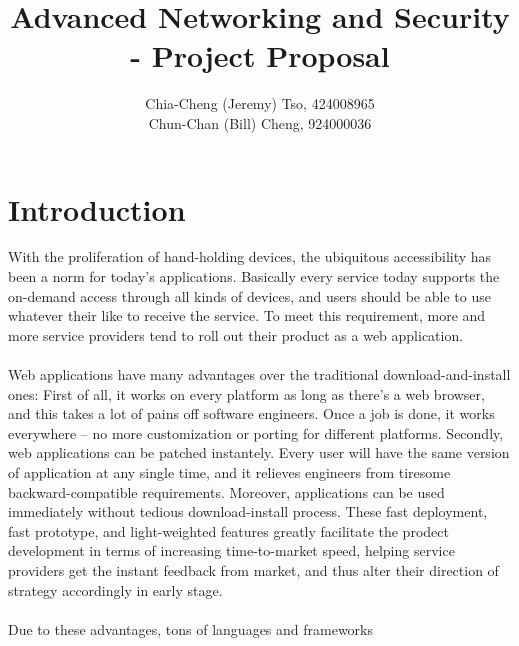 \documentclass[12pt, a4paper]{article}
\title{
    Advanced Networking and Security\\
    - Project Proposal
    \vspace{-2ex}
}
\author{
    \normalfont \normalsize 
    Chia-Cheng (Jeremy) Tso, 
    424008965\\
    \normalfont \normalsize 
    Chun-Chan (Bill) Cheng, 
    924000036
}
\date{
    \normalfont \normalsize 
    \vspace{-5ex}
}
\begin{document}
\maketitle
%

\section{Introduction}
With the proliferation of hand-holding devices,
the ubiquitous accessibility has been a norm for today's applications.
Basically every service today supports the on-demand access through all kinds of devices,
and users should be able to use whatever their like to receive the service.
To meet this requirement, more and more service providers tend to roll
out their product as a
web application.
\\\\
Web applications have many advantages over the traditional download-and-install ones:
First of all, it works on every platform as long as there's a web browser, and
this takes a lot of pains off software engineers. Once a job is done, it works everywhere
-- no more customization or porting for different platforms.
Secondly, web applications can be patched instantely.
Every user will have the same version of application at any single time,
and it relieves engineers from
tiresome backward-compatible requirements.
Moreover,
applications can be used immediately without tedious download-install process.
These fast deployment, fast prototype, and light-weighted features
greatly facilitate the prodect development in terms of
increasing time-to-market speed,
helping service providers get the instant
feedback from market, and thus alter their direction of strategy accordingly in early stage.
\\\\
Due to these advantages, tons of languages and frameworks
\end{document}
